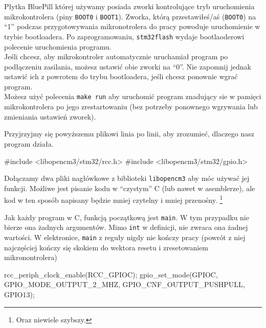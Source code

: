 \documentclass{pdfBooklets}
\begin{document}
\begin{ProTip}{}
  Płytka BluePill której używamy posiada zworki kontrolujące tryb uruchomienia mikrokontrolera (piny \Verb$BOOT0$ i \Verb$BOOT1$).
  Zworka, którą przestawiłeś/aś (\Verb$BOOT0$) na ``1'' podczas przygotowywania mikronotrolera do pracy powoduje uruchomienie w
  trybie bootloadera. Po zaprogramowaniu, \Verb$stm32flash$ wydaje bootlaoderowi polecenie uruchomienia programu.\\
  
  Jeśli chcesz, aby mikrokontroler automatycznie uruchamiał program po podłączeniu zasilania, możesz ustawić obie zworki na ``0''. Nie zapomnij
  jednak ustawić ich z powrotem do trybu bootloadera, jeśli chcesz ponownie wgrać program.\\
  
  Możesz użyć polecenia \Verb$make run$ aby uruchomić program znadujący sie w pamięci mikrokontrolera po jego zrestartowaniu (bez potrzeby ponownego wgrywania lub zmieniania ustawień zworek).
\end{ProTip}

Przyjrzyjmy się powyższemu plikowi linia po linii, aby zrozumieć, dlaczego nasz program działa.

\begin{CodeFrame*}[c]{}
#include <libopencm3/stm32/rcc.h>
#include <libopencm3/stm32/gpio.h>

\end{CodeFrame*}

Dołączamy dwa pliki nagłówkowe z biblioteki \Verb$libopencm3$ aby móc używać jej funkcji. Możliwe jest pisanie kodu w ``czystym'' C
(lub nawet w asemblerze), ale kod w ten sposób napisany będzie mniej czytelny i mniej przenośny.
\footnote{Oraz niewiele szybszy.}

\begin{CodeFrame*}[c]{}
int main() { 
\end{CodeFrame*}

Jak każdy program w C, funkcją początkową jest \verb$main$. W tym przypadku nie bierze ona żadnych argumentów. Mimo \Verb$int$ w
definicji, nie zwraca ona żadnej wartości. W elektronice, \Verb$main$ z reguły nigdy nie kończy pracy (powrót z niej najczęściej
kończy się skokiem do wektora resetu i zresetowaniem mikronontrolera)

\begin{CodeFrame*}[c]{}
  rcc_periph_clock_enable(RCC_GPIOC);
  gpio_set_mode(GPIOC, GPIO_MODE_OUTPUT_2_MHZ, GPIO_CNF_OUTPUT_PUSHPULL, GPIO13);
\end{CodeFrame*}
\end{document}
